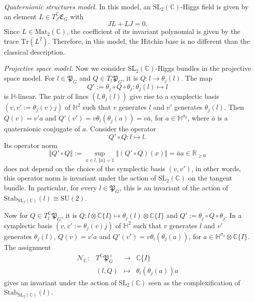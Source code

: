 \documentclass[oneside,11pt]{amsart}
\theoremstyle{definition}
\theoremstyle{remark}
\numberwithin{thm}{section}
\numberwithin{equation}{section}
\begin{document}
\vspace{2mm}

\noindent \textit{Quaternionic structures model.} In this model, an $\mathrm{SL}_2( \mathbb{C})$-Higgs field is given by an element $L \in T_J^{\mathbb{C}}\mathfrak{C}_G$ with 
\[JL +LJ =0.\]
Since $L \in \mathrm{Mat}_2(\mathbb{C})$, the coefficient of its invariant polynomial is given by the trace $\mathrm{Tr}(L^2)$. Therefore, in this model, the Hitchin base is no different than the classical description. 



\vspace{2mm}

\noindent \textit{Projective space model.} Now we consider $\mathrm{SL}_2(\mathbb{C})$-Higgs bundles in the projective space model. For $l\in \mathfrak{P}_G$ and $Q\in T_l\mathfrak{P}_G$, it is $Q \colon  l \to \theta_j(l)$. The map
    $$Q':=\theta_j\circ Q\circ\theta_j \colon  \theta_j(l) \mapsto l$$
is $\mathbb H$-linear. The pair of lines $(l,\theta_j(l))$ give rise to a symplectic basis $(v,v':=\theta_j(v)j)$ of $\mathbb H^2$ such that $v$ generates $l$ and $v'$ generates $\theta_j(l)$. Then $Q(v)=v'a$ and $Q'(v')=v\theta_i(\theta_j(a))=v\bar a$, for $a\in \mathbb H^{\sigma_0}$, where $\bar a$ is a quaternionic conjugate of $a$. Consider the operator 
\[Q' \circ Q \colon l \mapsto l.\]
Its operator norm 
\[\Vert Q' \circ Q \Vert :=\sup_{x\in l,\,\Vert x \Vert =1 }\Vert (Q' \circ Q)(x)\Vert=\bar a a\in\mathbb R_{\geq 0}\]
does not depend on the choice of the symplectic basis $(v,v')$, in other words, this operator norm is invariant under the action of $\mathrm{SL}_2(\mathbb C)$ on the tangent bundle. In particular, for every $l\in \mathfrak{P}_G$, this is an invariant of the action of $\mathrm{Stab}_{\mathrm{SL}_2(\mathbb C)}(l)\cong\mathrm{SU}(2)$.


Now for $Q\in T_l^\mathbb C\mathfrak{P}_G$, it is $Q \colon  l\otimes \mathbb C\{I\} \mapsto \theta_j(l)\otimes \mathbb C\{I\}$ and $Q':=\theta_j\circ Q\circ\theta_j$. In a symplectic basis $(v,v':=\theta_j(v)j)$ of $\mathbb H^2$ such that $v$ generates $l$ and $v'$ generates $\theta_j(l)$, $Q(v)=v'a$ and $Q'(v')=v\theta_i(\theta_j(a))$, for $a\in \mathbb H^{\sigma_0}\otimes\mathbb C\{I\}$. The assignment
$$\begin{array}{rccl}
\mathcal N_\mathbb C\colon &T^{\mathbb{C}}\mathfrak{P}_G^+ & \to & \mathbb C\{I\}\\
& (l,Q) &\mapsto &\theta_i(\theta_j(a))a
\end{array}$$
gives an invariant under the action of $\mathrm{SL}_2(\mathbb C)$ seen as the complexification of $\mathrm{Stab}_{\mathrm{SL}_2(\mathbb C)}(l)$.
\end{document}
